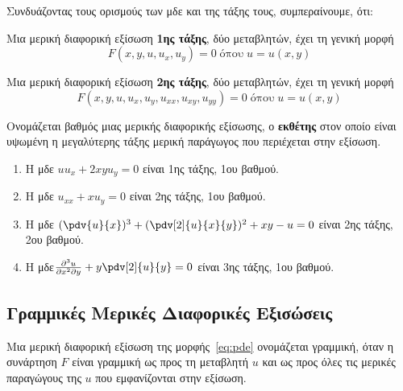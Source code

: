 \begin{rem}
  Συνδυάζοντας τους ορισμούς των μδε και της τάξης τους, συμπεραίνουμε, ότι:
  \begin{myitemize}
    \item Μια μερική διαφορική εξίσωση \textbf{1ης τάξης}, δύο μεταβλητών, έχει τη 
      γενική μορφή
      \[
        F(x,y,u,u_{x},u_{y}) = 0 \; \text{όπου} \; u=u(x,y)
      \] 
    \item Μια μερική διαφορική εξίσωση \textbf{2ης τάξης}, δύο μεταβλητών, έχει τη 
      γενική μορφή
      \[
        F(x,y,u,u_{x},u_{y},u_{xx},u_{xy},u_{yy}) = 0 \; \text{όπου} \; u=u(x,y)
      \] 
  \end{myitemize}
\end{rem}

\begin{mybox1}
  \begin{dfn}
    Ονομάζεται \textcolor{Col1}{βαθμός} μιας μερικής διαφορικής εξίσωσης, ο
    \textbf{εκθέτης} στον οποίο είναι υψωμένη η μεγαλύτερης τάξης μερική παράγωγος που 
    περιέχεται στην εξίσωση.
  \end{dfn}
\end{mybox1}

\begin{examples}
\item {}
  \begin{enumerate}
    \item Η μδε $ uu_{x}+2xyu_{y} = 0 $ είναι 1ης τάξης, 1ου βαθμού.
    \item Η μδε $ u_{xx}+xu_{y} = 0 $ είναι 2ης τάξης, 1ου βαθμού.
    \item Η μδε $ (\pdv{u}{x})^{3} + (\pdv[2]{u}{x}{y})^{2} + xy-u=0 $ είναι 2ης τάξης,
      2ου βαθμού.
    \item Η μδε$ \frac{\partial^{3}u}{\partial x^{2}\partial y} + y\pdv[2]{u}{y}=0 $ 
      είναι 3ης τάξης, 1ου βαθμού.
  \end{enumerate}
\end{examples}


\subsection*{Γραμμικές Μερικές Διαφορικές Εξισώσεις}

\begin{mybox1}
  \begin{dfn}
    Μια μερική διαφορική εξίσωση της μορφής~\eqref{eq:pde} ονομάζεται
    \textcolor{Col1}{γραμμική}, όταν η συνάρτηση $F$ είναι γραμμική ως προς τη μεταβλητή 
    $u$ και ως προς όλες τις μερικές παραγώγους της $u$ που εμφανίζονται στην εξίσωση.
  \end{dfn}
\end{mybox1}

